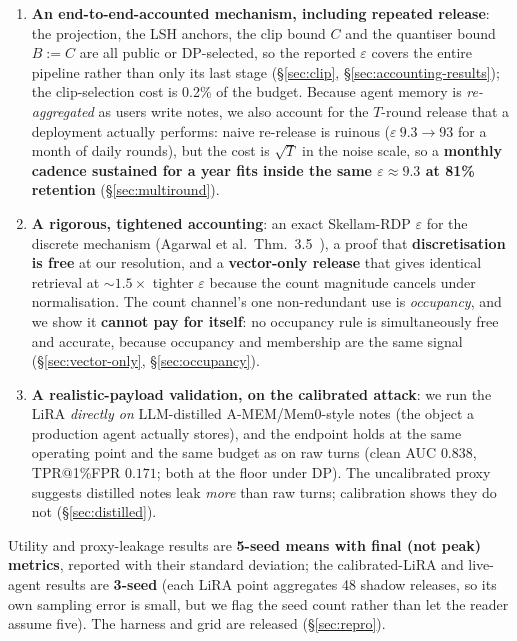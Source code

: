 \documentclass[pdflatex,sn-mathphys-num,12pt]{sn-jnl}
\theoremstyle{thmstyleone}%
\theoremstyle{thmstyletwo}%
\theoremstyle{thmstylethree}%
\newcommand{\eps}{\varepsilon}
\newcommand{\secref}[1]{\S\ref{#1}}
\begin{document}
\begin{enumerate}
  \item \textbf{An end-to-end-accounted mechanism, including repeated release}:
    the projection, the LSH anchors, the clip bound $C$ and the quantiser bound
    $B := C$ are all public or DP-selected, so the reported $\eps$ covers the
    entire pipeline rather than only its last stage (\secref{sec:clip},
    \secref{sec:accounting-results}); the clip-selection cost is 0.2\% of the
    budget. Because agent memory is \emph{re-aggregated} as users write notes, we
    also account for the $T$-round release that a deployment actually performs:
    naive re-release is ruinous ($\eps\ 9.3 \to 93$ for a month of daily rounds),
    but the cost is $\sqrt{T}$ in the noise scale, so a \textbf{monthly cadence
    sustained for a year fits inside the same $\eps \approx 9.3$ at 81\%
    retention} (\secref{sec:multiround}).

  \item \textbf{A rigorous, tightened accounting}: an exact Skellam-RDP $\eps$ for
    the discrete mechanism (Agarwal et al.\ Thm.~3.5~\cite{agarwal2021skellam}), a
    proof that \textbf{discretisation is free} at our resolution, and a
    \textbf{vector-only release} that gives identical retrieval at
    ${\sim}1.5\times$ tighter $\eps$ because the count magnitude cancels under
    normalisation. The count channel's one non-redundant use is \emph{occupancy},
    and we show it \textbf{cannot pay for itself}: no occupancy rule is
    simultaneously free and accurate, because occupancy and membership are the same
    signal (\secref{sec:vector-only}, \secref{sec:occupancy}).

  \item \textbf{A realistic-payload validation, on the calibrated attack}: we run
    the LiRA \emph{directly on} LLM-distilled A-MEM/Mem0-style notes (the object
    a production agent actually stores), and the endpoint holds at the same
    operating point and the same budget as on raw turns (clean AUC $0.838$,
    TPR@1\%FPR $0.171$; both at the floor under DP). The uncalibrated proxy suggests
    distilled notes leak \emph{more} than raw turns; calibration shows they do not
    (\secref{sec:distilled}).
\end{enumerate}

Utility and proxy-leakage results are \textbf{5-seed means with final (not peak) metrics},
reported with their standard deviation; the calibrated-LiRA and live-agent results are
\textbf{3-seed} (each LiRA point aggregates 48 shadow releases, so its own sampling error is
small, but we flag the seed count rather than let the reader assume five). The harness and
grid are released (\secref{sec:repro}).
\end{document}
